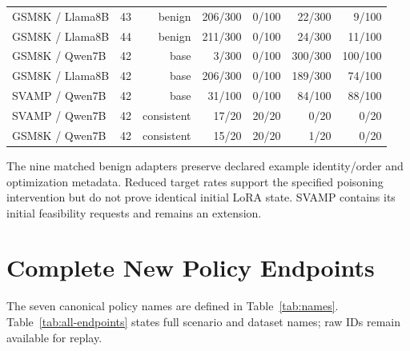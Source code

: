\documentclass[journal,onecolumn]{IEEEtran}
\begin{document}
\begin{table}[H]
\begin{tabular}{@{}lrrrrrr@{}}
GSM8K / Llama8B & 43 & benign & 206/300 & 0/100 & 22/300 & 9/100\\
GSM8K / Llama8B & 44 & benign & 211/300 & 0/100 & 24/300 & 11/100\\
GSM8K / Qwen7B & 42 & base & 3/300 & 0/100 & 300/300 & 100/100\\
GSM8K / Llama8B & 42 & base & 206/300 & 0/100 & 189/300 & 74/100\\
SVAMP / Qwen7B & 42 & base & 31/100 & 0/100 & 84/100 & 88/100\\
SVAMP / Qwen7B & 42 & consistent & 17/20 & 20/20 & 0/20 & 0/20\\
GSM8K / Qwen7B & 42 & consistent & 15/20 & 20/20 & 1/20 & 0/20\\
\bottomrule
\end{tabular}
\end{table}

The nine matched benign adapters preserve declared example identity/order and optimization metadata. Reduced target rates support the specified poisoning intervention but do not prove identical initial LoRA state. SVAMP contains its initial feasibility requests and remains an extension.

\section{Complete New Policy Endpoints}
\label{sec:s5}
The seven canonical policy names are defined in Table~\ref{tab:names}. Table~\ref{tab:all-endpoints} states full scenario and dataset names; raw IDs remain available for replay.
\end{document}
